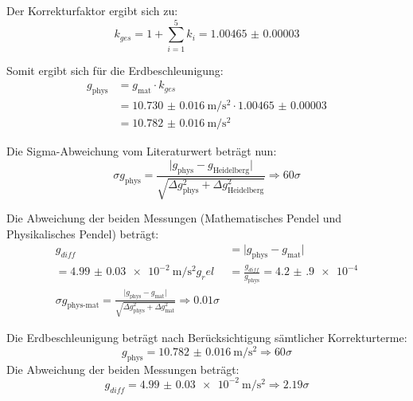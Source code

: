 \documentclass[12pt,a4paper,titlepage]{scrartcl}
\numberwithin{equation}{section}
\numberwithin{table}{section}
\numberwithin{figure}{section}
\begin{document}
Der Korrekturfaktor ergibt sich zu:
\begin{equation}
    k_{ges} = 1 + \sum_{i=1}^{5}{k_i} = \num{1.00465(3)}
\end{equation}

Somit ergibt sich für die Erdbeschleunigung:
\begin{align}
    g_\text{phys} &= g_\text{mat} \cdot k_{ges}\\
     &= \qty{10.730(16)}{\meter\per\second\squared} \cdot \num{1.00465(3)}\\
     &= \qty{10.782(16)}{\meter\per\second\squared} 
\end{align}

Die Sigma-Abweichung vom Literaturwert beträgt nun:
\begin{equation}
    \sigma g_\text{phys} = \frac{\lvert g_\text{phys} - g_\text{Heidelberg}\rvert}{\sqrt{\Delta g_\text{phys}^2 + \Delta g_\text{Heidelberg}^2}} \Rightarrow 60\sigma
\end{equation}

Die Abweichung der beiden Messungen (Mathematisches Pendel und Physikalisches Pendel) beträgt:
\begin{align}
    g_{diff} &= \lvert g_\text{phys} - g_\text{mat}\rvert\\ = \qty{4.99(3)e-2}{\meter\per\second\squared}
    g_rel & = \frac{g_{diff}}{g_\text{phys}} = \num{4.2(9)e-4}\\
    \sigma g_\text{phys-mat} = \frac{\lvert g_\text{phys} - g_\text{mat}\rvert}{\sqrt{\Delta g_\text{phys}^2 + \Delta g_\text{mat}^2}} \Rightarrow 0.01\sigma
\end{align}

\begin{resultbox}
    Die Erdbeschleunigung beträgt nach Berücksichtigung sämtlicher Korrekturterme:
    \begin{equation}
        g_\text{phys} = \qty{10.782(16)}{\meter\per\second\squared} \Rightarrow 60\sigma
    \end{equation}
    Die Abweichung der beiden Messungen beträgt:
    \begin{equation}
    g_{diff} = \qty{4.99(3)e-2}{\meter\per\second\squared} \Rightarrow 2.19\sigma  
    \end{equation}
\end{resultbox}

\bigskip
\end{document}
